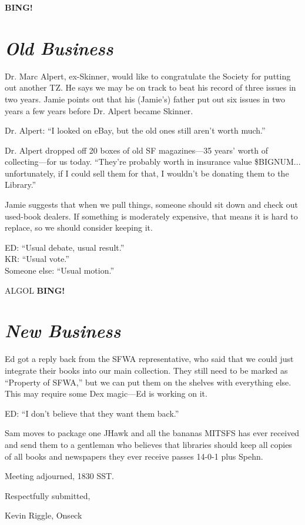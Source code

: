 \documentclass[10pt]{article}
\newcommand{\bing}{{\bf BING!} }
\newcommand{\goto}[1]{\bing \vskip 12pt \section*{{\em{#1}}}}
\newcommand{\ps}{ plus Spehn\xspace}
\begin{document}




\goto{Old Business}

Dr. Marc Alpert, ex-Skinner, would like to congratulate the Society for putting
out another TZ.  He says we may be on track to beat his record of three issues
in two years.  Jamie points out that his (Jamie's) father put out six issues in two 
years a few years before Dr. Alpert became Skinner.

Dr. Alpert: ``I looked on eBay, but the old ones still aren't worth much.''

Dr. Alpert dropped off 20 boxes of old SF magazines---35 years' worth of 
collecting---for us today.  ``They're probably worth in insurance value
\$BIGNUM... unfortunately, if I could sell them for that, I wouldn't be
donating them to the Library.''

Jamie suggests that when we pull things, someone should sit down and check out
used-book dealers.  If something is moderately expensive, that means it is 
hard to replace, so we should consider keeping it.

ED: ``Usual debate, usual result.''\\
KR: ``Usual vote.''\\
Someone else: ``Usual motion.''

ALGOL
\goto{New Business}
Ed got a reply back from the SFWA representative, who said that we could just
integrate their books into our main collection.  They still need to be marked
as ``Property of SFWA,'' but we can put them on the shelves with everything
else.  This may require some Dex magic---Ed is working on it.

ED: ``I don't believe that they want them back.''

Sam moves to package one JHawk and all the bananas MITSFS has ever received
and send them to a gentleman who believes that libraries should keep all 
copies of all books and newspapers they ever receive passes 14-0-1\ps.

\vspace{12pt}

\noindent
Meeting adjourned, 1830 SST.

\vspace{18pt}

\centerline{Respectfully submitted,}
\centerline{Kevin Riggle, Onseck}
\end{document}
